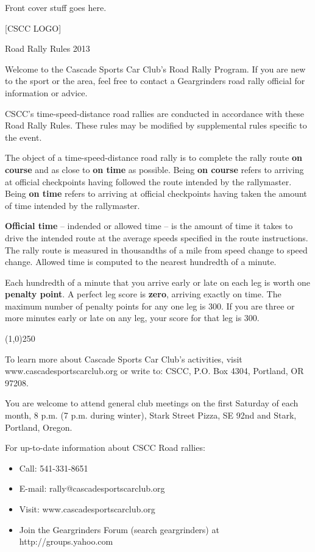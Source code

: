 \documentclass[letterpaper,10pt]{article}
\begin{document}
\pagestyle{empty}
\begin{titlepage}
Front cover stuff goes here.

[CSCC LOGO]

Road Rally Rules 2013
\end{titlepage}
\newpage

Welcome to the Cascade Sports Car Club's Road Rally Program. If you are new to
the sport or the area, feel free to contact a Geargrinders road rally official
for information or advice.

CSCC's time-speed-distance road rallies are conducted in accordance with these
Road Rally Rules. These rules may be modified by supplemental rules specific to
the event.

The object of a time-speed-distance road rally is to complete the rally route
\textbf{on course} and as close to \textbf{on time} as possible. Being \textbf{on
course} refers to arriving at official checkpoints having followed the route
intended by the rallymaster. Being \textbf{on time} refers to arriving at official
checkpoints having taken the amount of time intended by the rallymaster.

\textbf{Official time} -- indended or allowed time -- is the amount of
time it takes to drive the intended route at the average speeds specified in the
route instructions. The rally route is measured in thousandths of a mile from
speed change to speed change. Allowed time is computed to the nearest hundredth
of a minute.

Each hundredth of a minute that you arrive early or late on each leg is worth
one \textbf{penalty point}. A perfect leg score is \textbf{zero}, arriving exactly
on time. The maximum number of penalty points for any one leg is 300. If you are
three or more minutes early or late on any leg, your score for that leg is 300.

\begin{center}
\line(1,0){250}
\end{center}

To learn more about Cascade Sports Car Club's activities, visit www.cascadesportscarclub.org or write to: CSCC, P.O. Box 4304, Portland, OR 97208.

You are welcome to attend general club meetings on the first Saturday of each month, 8 p.m. (7 p.m. during winter), Stark Street Pizza, SE 92nd and Stark, Portland, Oregon.

For up-to-date information about CSCC Road rallies:
\begin{itemize}
  \item Call: 541-331-8651
  \item E-mail: rally@cascadesportscarclub.org
  \item Visit: www.cascadesportscarclub.org
  \item Join the Geargrinders Forum (search geargrinders) at http://groups.yahoo.com
\end{itemize}
\end{document}
